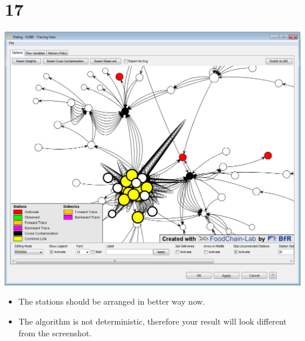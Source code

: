 \documentclass{beamer}
\begin{document}
\section{17}
\begin{frame}
	\begin{center}
  		\includegraphics[height=0.6\textheight]{17.png}
	\end{center}
	\begin{itemize}
		\item The stations should be arranged in better way now.
		\item The algorithm is not deterministic, therefore your result will look different from the screenshot.		
	\end{itemize}
\end{frame}
\end{document}
